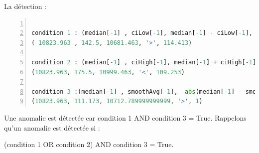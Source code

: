 La détection : 
\begin{lstlisting}[language=python,numbers=left,
frame=single,
showstringspaces=true,
basicstyle=\footnotesize,
keywordstyle=\color{blue}\ttfamily\textbf,
identifierstyle=\color{magenta}\ttfamily,
stringstyle=\color{red}\ttfamily,
commentstyle=\color{cyan}\ttfamily\textit
]

condition 1 : (median[-1] , ciLow[-1], median[-1] - ciLow[-1], >, smoothHi[-1])
( 10823.963 , 142.5, 10681.463, '>', 114.413)

condition 2 : (median[-1] , ciHigh[-1], median[-1] + ciHigh[-1] < smoothLow[-1])
(10823.963, 175.5, 10999.463, '<', 109.253)

condition 3 :(median[-1] , smoothAvg[-1],  abs(median[-1] - smoothAvg[-1]), >, 1)
(10823.963, 111.173, 10712.789999999999, '>', 1)
\end{lstlisting}

Une anomalie est détectée car condition 1 AND condition 3 = True. Rappelons qu'un anomalie est détectée si :

(condition 1 OR condition 2) AND condition 3 = True.




